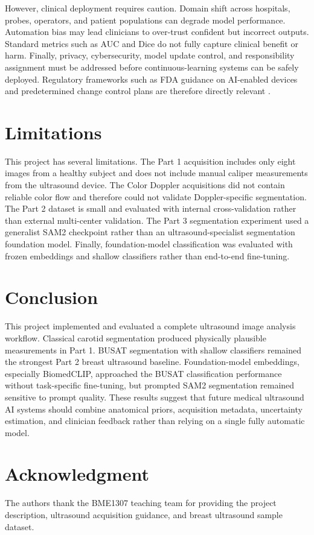 \documentclass[conference]{IEEEtran}
\begin{document}
However, clinical deployment requires caution. Domain shift across hospitals, probes, operators, and patient populations can degrade model performance. Automation bias may lead clinicians to over-trust confident but incorrect outputs. Standard metrics such as AUC and Dice do not fully capture clinical benefit or harm. Finally, privacy, cybersecurity, model update control, and responsibility assignment must be addressed before continuous-learning systems can be safely deployed. Regulatory frameworks such as FDA guidance on AI-enabled devices and predetermined change control plans are therefore directly relevant \cite{fdaaiml,fdapccp}.

\section{Limitations}
This project has several limitations. The Part 1 acquisition includes only eight images from a healthy subject and does not include manual caliper measurements from the ultrasound device. The Color Doppler acquisitions did not contain reliable color flow and therefore could not validate Doppler-specific segmentation. The Part 2 dataset is small and evaluated with internal cross-validation rather than external multi-center validation. The Part 3 segmentation experiment used a generalist SAM2 checkpoint rather than an ultrasound-specialist segmentation foundation model. Finally, foundation-model classification was evaluated with frozen embeddings and shallow classifiers rather than end-to-end fine-tuning.

\section{Conclusion}
This project implemented and evaluated a complete ultrasound image analysis workflow. Classical carotid segmentation produced physically plausible measurements in Part 1. BUSAT segmentation with shallow classifiers remained the strongest Part 2 breast ultrasound baseline. Foundation-model embeddings, especially BiomedCLIP, approached the BUSAT classification performance without task-specific fine-tuning, but prompted SAM2 segmentation remained sensitive to prompt quality. These results suggest that future medical ultrasound AI systems should combine anatomical priors, acquisition metadata, uncertainty estimation, and clinician feedback rather than relying on a single fully automatic model.

\section*{Acknowledgment}
The authors thank the BME1307 teaching team for providing the project description, ultrasound acquisition guidance, and breast ultrasound sample dataset.



\end{document}

